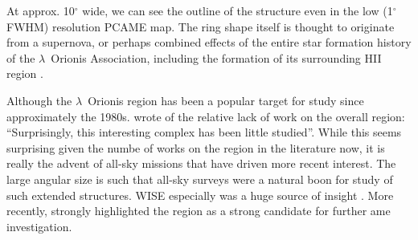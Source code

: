     At approx. 10$^{\circ}$ wide, we can see the outline of the structure even in the low (1$^{\circ}$ FWHM) resolution PCAME map. The ring shape itself is thought to originate from a supernova, or perhaps combined effects of the entire star formation history of the $\lambda$~Orionis Association, including the formation of its surrounding HII region \citep{aran09}.

    Although the $\lambda$~Orionis region has been a popular target for study since approximately the 1980s. \cite{duerr82} wrote of the relative lack of work on the overall region: ``Surprisingly, this interesting complex has been little studied''. While this seems surprising given the numbe of works on the region in the literature now, it is really the advent of all-sky missions that have driven more recent interest.  The large angular size is such that all-sky surveys were a natural boon for study of such extended structures. WISE especially was a huge source of insight \citep{koenig15}. More recently, \cite{planck15XXV} strongly highlighted the region as a strong candidate for further \acrshort{ame} investigation.

